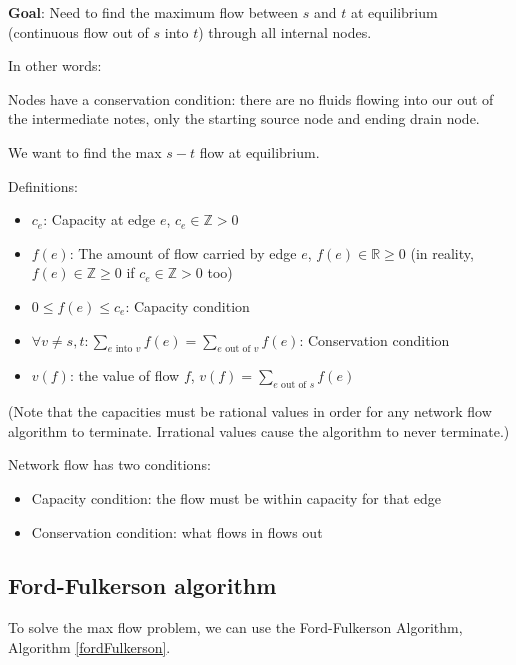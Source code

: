 \documentclass{article}
\begin{document}
\textbf{Goal}: Need to find the maximum flow between $s$ and $t$ at equilibrium (continuous flow out of $s$ into $t$) through all internal nodes.

In other words:

Nodes have a conservation condition: there are no fluids flowing into our out of the intermediate notes, only the starting source node and ending drain node.

We want to find the max $s-t$ flow at equilibrium.

Definitions:
\begin{itemize}
    \item $c_e$: Capacity at edge $e$, $c_e \in \mathbb{Z} > 0$
    \item $f(e)$: The amount of flow carried by edge $e$, $f(e) \in \mathbb{R} \geq 0$ (in reality, $f(e) \in \mathbb{Z} \geq 0$ if $c_e \in \mathbb{Z} > 0$ too)
    \item $0 \leq f(e) \leq c_e$: Capacity condition
    \item $\forall v \neq s,t: \sum_{e\text{ into }v} f(e) = \sum_{e\text{ out of }v} f(e)$: Conservation condition
    \item $v(f)$: the value of flow $f$, $v(f) = \sum_{e\text{ out of }s} f(e)$
\end{itemize}

(Note that the capacities must be rational values in order for any network flow algorithm to terminate. Irrational values cause the algorithm to never terminate.)

Network flow has two conditions:
\begin{itemize}
    \item Capacity condition: the flow must be within capacity for that edge
    \item Conservation condition: what flows in flows out
\end{itemize}

\subsection{Ford-Fulkerson algorithm}

To solve the max flow problem, we can use the Ford-Fulkerson Algorithm, Algorithm \ref{fordFulkerson}.
\end{document}
